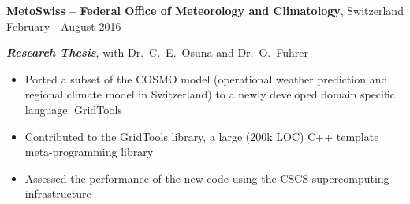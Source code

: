 
\textbf{MetoSwiss -- Federal Office of Meteorology and Climatology}, Switzerland \hfill February - August 2016

\textbf{\textit{Research Thesis}}, with Dr.\ C.\ E.\ Osuna and Dr.\ O.\ Fuhrer

\begin{itemize}
	\item Ported a subset of the COSMO model (operational weather prediction and regional climate model in Switzerland) to a newly developed domain specific language: GridTools
	\item  Contributed to the GridTools library, a large (200k LOC) C++ template meta-programming library
	\item Assessed the performance of the new code using the CSCS supercomputing infrastructure
\end{itemize}
